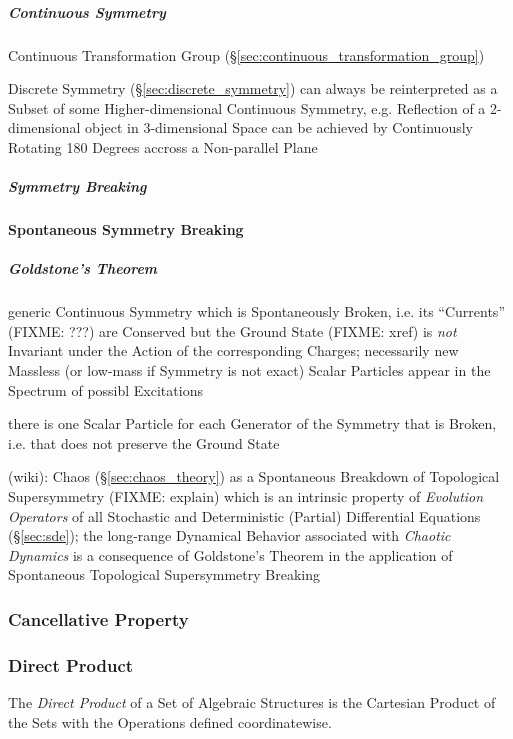 \subparagraph{Continuous Symmetry}\label{sec:continuous_symmetry}\hfill

Continuous Transformation Group
(\S\ref{sec:continuous_transformation_group})

Discrete Symmetry (\S\ref{sec:discrete_symmetry}) can always be reinterpreted as
a Subset of some Higher-dimensional Continuous Symmetry, e.g. Reflection of a
2-dimensional object in 3-dimensional Space can be achieved by Continuously
Rotating 180 Degrees accross a Non-parallel Plane



\subparagraph{Symmetry Breaking}\label{sec:symmetry_breaking}\hfill

\textbf{Spontaneous Symmetry Breaking}



\subparagraph{Goldstone's Theorem}\label{sec:goldstones_theorem}\hfill

generic Continuous Symmetry which is Spontaneously Broken, i.e. its ``Currents''
(FIXME: ???) are Conserved but the Ground State (FIXME: xref) is \emph{not}
Invariant under the Action of the corresponding Charges; necessarily new
Massless (or low-mass if Symmetry is not exact) Scalar Particles appear in the
Spectrum of possibl Excitations

there is one Scalar Particle for each Generator of the Symmetry that is Broken,
i.e. that does not preserve the Ground State

(wiki): Chaos (\S\ref{sec:chaos_theory}) as a Spontaneous Breakdown of
Topological Supersymmetry (FIXME: explain) which is an intrinsic property of
\emph{Evolution Operators} of all Stochastic and Deterministic (Partial)
Differential Equations (\S\ref{sec:sde}); the long-range Dynamical Behavior
associated with \emph{Chaotic Dynamics} is a consequence of Goldstone's Theorem
in the application of Spontaneous Topological Supersymmetry Breaking



\subsubsection{Cancellative Property}\label{sec:cancellative_property}

\subsubsection{Direct Product}\label{sec:direct_product}

The \emph{Direct Product} of a Set of Algebraic Structures is the Cartesian
Product of the Sets with the Operations defined coordinatewise.



